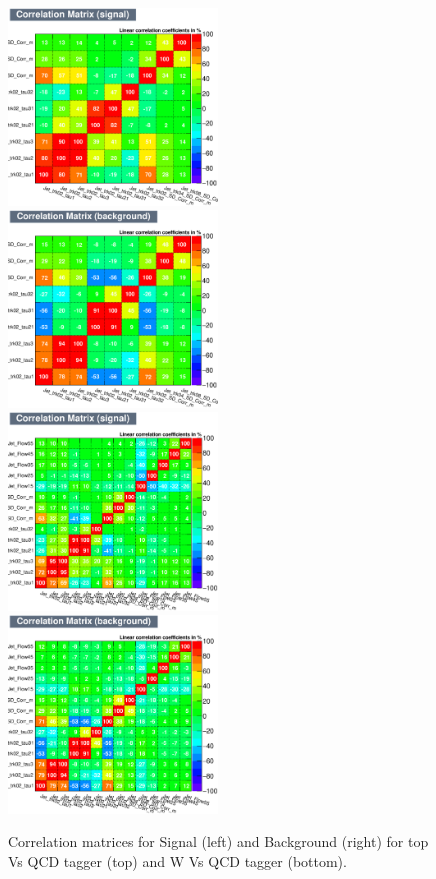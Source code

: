 \documentclass{cernrep}
\begin{document}
\begin{figure}[!htb]\centering
\includegraphics[width=0.495\textwidth]{Fig/TMVA/thad_vs_QCD/CorrelationMatrixS.eps}
\includegraphics[width=0.495\textwidth]{Fig/TMVA/thad_vs_QCD/CorrelationMatrixB.eps}
\includegraphics[width=0.495\textwidth]{Fig/TMVA/Whad_vs_QCD/CorrelationMatrixS.eps}
\includegraphics[width=0.495\textwidth]{Fig/TMVA/Whad_vs_QCD/CorrelationMatrixB.eps}
\caption{Correlation matrices for Signal (left) and Background (right) for top Vs QCD tagger (top) and W Vs QCD tagger (bottom).}
\label{fig:TMVA_corr_matrix}
\end{figure}
\end{document}
